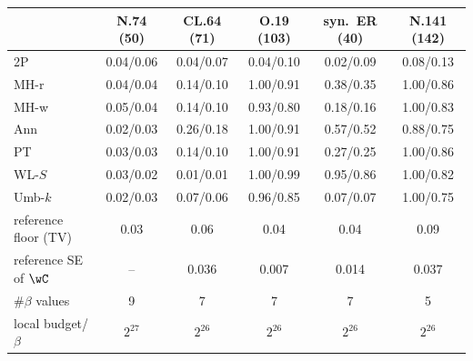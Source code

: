 \begin{tabular}{lccccc}
\toprule
 & N.74 (50) & CL.64 (71) & O.19 (103) & syn.\ ER (40) & N.141 (142) \\
\midrule
2P & 0.04/0.06 & 0.04/0.07 & 0.04/0.10 & 0.02/0.09 & 0.08/0.13 \\
MH-r & 0.04/0.04 & 0.14/0.10 & 1.00/0.91 & 0.38/0.35 & 1.00/0.86 \\
MH-w & 0.05/0.04 & 0.14/0.10 & 0.93/0.80 & 0.18/0.16 & 1.00/0.83 \\
Ann & 0.02/0.03 & 0.26/0.18 & 1.00/0.91 & 0.57/0.52 & 0.88/0.75 \\
PT & 0.03/0.03 & 0.14/0.10 & 1.00/0.91 & 0.27/0.25 & 1.00/0.86 \\
WL-$S$ & 0.03/0.02 & 0.01/0.01 & 1.00/0.99 & 0.95/0.86 & 1.00/0.82 \\
Umb-$k$ & 0.02/0.03 & 0.07/0.06 & 0.96/0.85 & 0.07/0.07 & 1.00/0.75 \\
\midrule
reference floor (TV) & 0.03 & 0.06 & 0.04 & 0.04 & 0.09 \\
reference SE of $\wC$ & -- & 0.036 & 0.007 & 0.014 & 0.037 \\
$\#\beta$ values & 9 & 7 & 7 & 7 & 5 \\
local budget/$\beta$ & $2^{27}$ & $2^{26}$ & $2^{26}$ & $2^{26}$ & $2^{26}$ \\
\bottomrule
\end{tabular}
